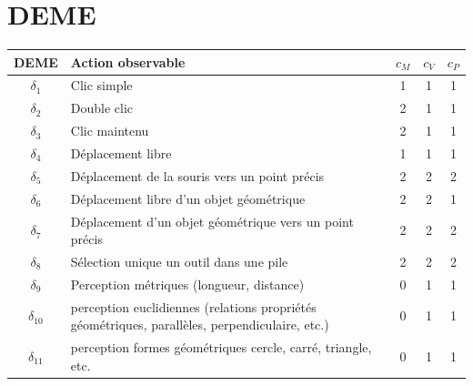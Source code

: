 \newcommand{\rref}[1]{$r_{\ref{#1}}$}
\newcommand{\cref}[1]{$\sigma_{\ref{#1}}$}
\newcommand{\pref}[1]{$\rho_{\ref{#1}}$}
\newcommand{\dref}[1]{$\delta_{\ref{#1}}$}

\section*{DEME}
\begin{longtable}{|c|p{5cm}|c|c|c|}
\hline
DEME & Action observable & $c_M$ & $c_V$ & $c_P$ \\ \hline
$\delta_{1}$\label{deme_clic_simple} & Clic simple & 1 & 1 & 1 \\ \hline
$\delta_{2}$\label{deme_double_clic} & Double clic & 2 & 1 & 1 \\ \hline
$\delta_{3}$\label{deme_clic_maintenu} & Clic maintenu & 2 & 1 & 1 \\ \hline
$\delta_{4}$\label{deme_depl_libre} & Déplacement libre & 1 & 1 & 1 \\ \hline
$\delta_{5}$\label{deme_depl_souris_point} & Déplacement de la souris vers un point précis  & 2 & 2 & 2 \\ \hline
$\delta_{6}$\label{deme_depl_objet_libre} & Déplacement libre d’un objet géométrique & 2 & 2 & 1 \\ \hline
$\delta_{7}$\label{deme_depl_objet_point} & Déplacement d’un objet géométrique vers un point précis & 2 & 2 & 2 \\ \hline
$\delta_{8}$\label{deme_selec_outil} & Sélection unique un outil dans une pile  & 2 & 2 & 2 \\ \hline
$\delta_{9}$\label{deme_perc_metrique} & Perception métriques (longueur, distance) & 0 & 1 & 1 \\ \hline
$\delta_{10}$\label{deme_perc_euclidienne} & perception euclidiennes (relations propriétés géométriques, parallèles, perpendiculaire, etc.) & 0 & 1 & 1 \\ \hline
$\delta_{11}$\label{deme_perc_forme} & perception formes géométriques cercle, carré, triangle, etc. & 0 & 1 & 1 \\ \hline
\end{longtable}

